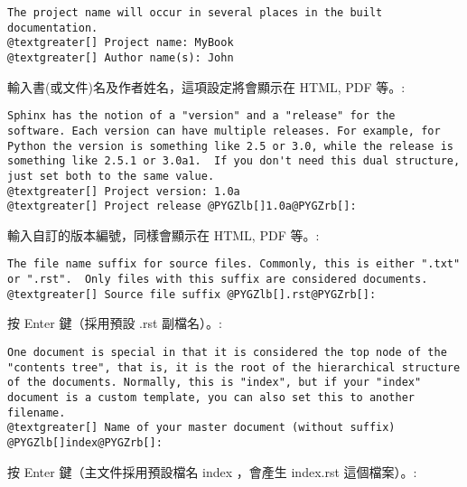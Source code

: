 \documentclass[a4paper,12pt,english]{sphinxmanual}
\begin{document}
\begin{Verbatim}[commandchars=@\[\]]
The project name will occur in several places in the built documentation.
@textgreater[] Project name: MyBook
@textgreater[] Author name(s): John
\end{Verbatim}

輸入書(或文件)名及作者姓名，這項設定將會顯示在 HTML, PDF 等。:

\begin{Verbatim}[commandchars=@\[\]]
Sphinx has the notion of a "version" and a "release" for the
software. Each version can have multiple releases. For example, for
Python the version is something like 2.5 or 3.0, while the release is
something like 2.5.1 or 3.0a1.  If you don't need this dual structure,
just set both to the same value.
@textgreater[] Project version: 1.0a
@textgreater[] Project release @PYGZlb[]1.0a@PYGZrb[]:
\end{Verbatim}

輸入自訂的版本編號，同樣會顯示在 HTML, PDF 等。:

\begin{Verbatim}[commandchars=@\[\]]
The file name suffix for source files. Commonly, this is either ".txt"
or ".rst".  Only files with this suffix are considered documents.
@textgreater[] Source file suffix @PYGZlb[].rst@PYGZrb[]:
\end{Verbatim}

按 Enter 鍵（採用預設 .rst 副檔名）。:

\begin{Verbatim}[commandchars=@\[\]]
One document is special in that it is considered the top node of the
"contents tree", that is, it is the root of the hierarchical structure
of the documents. Normally, this is "index", but if your "index"
document is a custom template, you can also set this to another filename.
@textgreater[] Name of your master document (without suffix) @PYGZlb[]index@PYGZrb[]:
\end{Verbatim}

按 Enter 鍵（主文件採用預設檔名 index ，會產生 index.rst 這個檔案）。:
\end{document}
